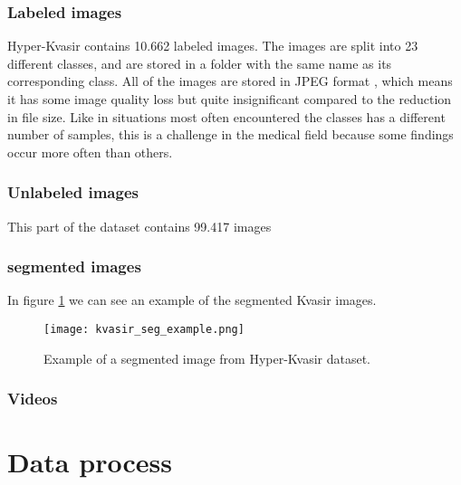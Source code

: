 \documentclass[thesis.tex]{subfiles}
\begin{document}
\subsubsection{Labeled images}
Hyper-Kvasir contains 10.662 labeled images. The images are split into 23 different classes, and are stored in a folder with the same name as its corresponding class. All of the images are stored in JPEG format \cite{JPEGStill92}, which means it has some image quality loss but quite insignificant compared to the reduction in file size. Like in situations most often encountered the classes has a different number of samples, this is a challenge in the medical field because some findings occur more often than others.


\subsubsection{Unlabeled images}
This part of the dataset contains 99.417 images

\subsubsection{segmented images}
In figure \ref{fig:kvasir_seg_example} we can see an example of the segmented Kvasir images.

\begin{figure}[H] %
  \begin{center}
    \texttt{[image: kvasir\_seg\_example.png]}
    \caption{Example of a segmented image from Hyper-Kvasir dataset.}
    \label{fig:kvasir_seg_example}
  \end{center}
\end{figure}


\subsubsection{Videos}




\section{Data process} \label{data_pipeline}
\end{document}

